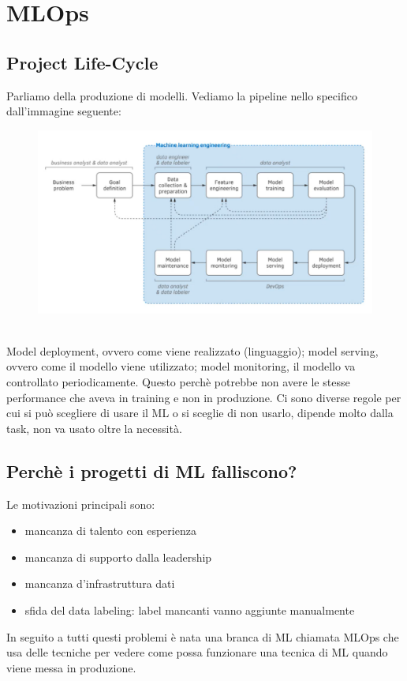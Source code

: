 
\section{MLOps}
\subsection{Project Life-Cycle}
Parliamo della produzione di modelli. Vediamo la pipeline nello specifico dall'immagine seguente:
\\
\begin{figure}[th]
    \centering
    \includegraphics[scale=0.5]{ExplainableAI/img/mlops.png}
\end{figure}
\\
Model deployment, ovvero come viene realizzato (linguaggio); model serving, ovvero come il modello viene utilizzato; model monitoring, il modello va controllato periodicamente. Questo perchè potrebbe non avere le stesse performance che aveva in training e non in produzione. Ci sono diverse regole per cui si può scegliere di usare il ML o si sceglie di non usarlo, dipende molto dalla task, non va usato oltre la necessità. 

\subsection{Perchè i progetti di ML falliscono?}
Le motivazioni principali sono:
\begin{itemize}
    \item mancanza di talento con esperienza
    \item mancanza di supporto dalla leadership
    \item mancanza d'infrastruttura dati
    \item sfida del data labeling: label mancanti vanno aggiunte manualmente
\end{itemize}
In seguito a tutti questi problemi è nata una branca di ML chiamata MLOps che usa delle tecniche per vedere come possa funzionare una tecnica di ML quando viene messa in produzione. 

